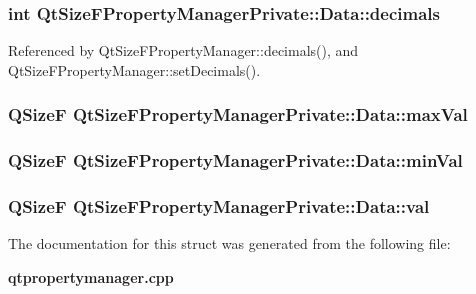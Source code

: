 \subsubsection[{decimals}]{\setlength{\rightskip}{0pt plus 5cm}int Qt\+Size\+F\+Property\+Manager\+Private\+::\+Data\+::decimals}\label{structQtSizeFPropertyManagerPrivate_1_1Data_a871b0ca327c6c659117f12e1963f9af8}


Referenced by Qt\+Size\+F\+Property\+Manager\+::decimals(), and Qt\+Size\+F\+Property\+Manager\+::set\+Decimals().

\subsubsection[{max\+Val}]{\setlength{\rightskip}{0pt plus 5cm}Q\+SizeF Qt\+Size\+F\+Property\+Manager\+Private\+::\+Data\+::max\+Val}\label{structQtSizeFPropertyManagerPrivate_1_1Data_af8490a0b873de7c612b70e3b575db1b3}
\subsubsection[{min\+Val}]{\setlength{\rightskip}{0pt plus 5cm}Q\+SizeF Qt\+Size\+F\+Property\+Manager\+Private\+::\+Data\+::min\+Val}\label{structQtSizeFPropertyManagerPrivate_1_1Data_a0006473717568aec1a5d8ee1e65364a9}
\subsubsection[{val}]{\setlength{\rightskip}{0pt plus 5cm}Q\+SizeF Qt\+Size\+F\+Property\+Manager\+Private\+::\+Data\+::val}\label{structQtSizeFPropertyManagerPrivate_1_1Data_aa30f0dbebbd4d71c45c7cc1ef703ab32}


The documentation for this struct was generated from the following file\+:\begin{DoxyCompactItemize}
\item 
{\bf qtpropertymanager.\+cpp}\end{DoxyCompactItemize}
